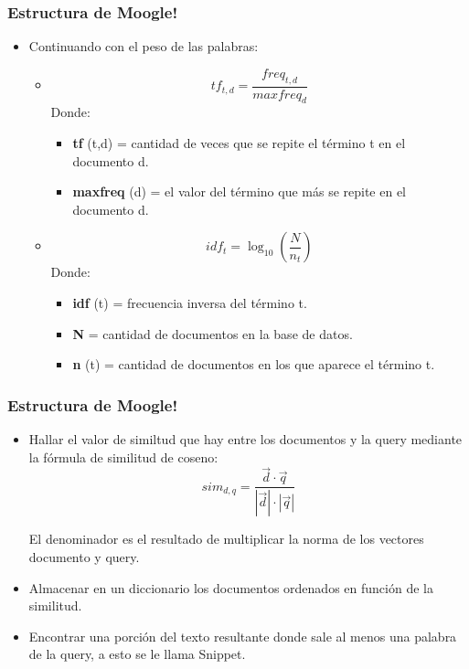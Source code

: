 \documentclass{beamer}
\begin{document}
\begin{frame}
    \frametitle{Estructura de Moogle!}
    \begin{itemize}
        \item Continuando con el peso de las palabras:\\
        \begin{itemize}
            \item \begin{equation}
                tf_{t,d} = \frac{freq_{t,d}}{maxfreq_d}
                \end{equation}
                \Large Donde:\\
                \begin{itemize}
                    \item \textbf{tf} (t,d) = cantidad de veces que se repite el t\'ermino t en el documento d.
                    \item \textbf{maxfreq} (d) = el valor del t\'ermino que m\'as se repite en el documento d.
                \end{itemize}
            \item \begin{equation}
                  idf_t = \log_{10} (\frac {N} {n_t})
            \end{equation}
            \Large Donde:\\ 
            \begin{itemize}
                \item \textbf{idf} (t) = frecuencia inversa del t\'ermino t.
                \item \textbf{N} = cantidad de documentos en la base de datos.
                \item \textbf{n} (t) = cantidad de documentos en los que aparece el t\'ermino t.
            \end{itemize}
         \end{itemize}
    \end{itemize}
\end{frame}

\begin{frame}
    \frametitle{Estructura de Moogle!}
   \begin{itemize}
    \item Hallar el valor de similtud que hay entre los documentos y la query mediante la f\'ormula de similitud de coseno:
     \begin{equation}
      sim_{d,q} = \frac{\vec{d} \cdot \vec{q}}{|\vec{d}|\cdot |\vec{q}|}
     \end{equation}
     \begin{center}
         \tiny El denominador es el resultado de multiplicar la norma de los vectores documento y query.
     \end{center}
      \item Almacenar en un diccionario los documentos ordenados en funci\'on de la similitud. 
      \item Encontrar una porci\'on del texto resultante donde sale al menos una palabra de la query, a esto se le llama Snippet.
   \end{itemize}
\end{frame}
\end{document}
